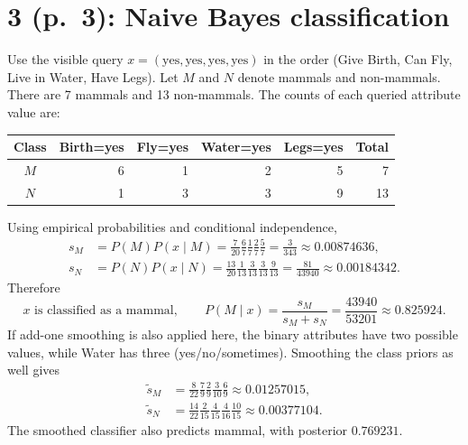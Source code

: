 \documentclass[11pt,a4paper]{article}
\begin{document}
\newpage
\section*{3 (p.\ 3): Naive Bayes classification}
Use the visible query $x=(\text{yes},\text{yes},\text{yes},\text{yes})$
in the order (Give Birth, Can Fly, Live in Water, Have Legs).
Let $M$ and $N$ denote mammals and non-mammals. There are 7 mammals and
13 non-mammals. The counts of each queried attribute value are:
\begin{center}
\begin{tabular}{c|rrrr|r}
\toprule
Class & Birth=yes & Fly=yes & Water=yes & Legs=yes & Total\\
\midrule
$M$ &6&1&2&5&7\\
$N$ &1&3&3&9&13\\
\bottomrule
\end{tabular}
\end{center}
Using empirical probabilities and conditional independence,
\[
\begin{aligned}
 s_M&=P(M)P(x\mid M)=\frac7{20}\frac67\frac17\frac27\frac57
      =\frac3{343}\approx0.00874636,\\
 s_N&=P(N)P(x\mid N)=\frac{13}{20}\frac1{13}\frac3{13}\frac3{13}\frac9{13}
      =\frac{81}{43940}\approx0.00184342.
\end{aligned}
\]
Therefore
\[
 \boxed{x\text{ is classified as a mammal}},\qquad
 P(M\mid x)=\frac{s_M}{s_M+s_N}=\frac{43940}{53201}\approx0.825924.
\]
If add-one smoothing is also applied here, the binary attributes have two
possible values, while Water has three (yes/no/sometimes). Smoothing the
class priors as well gives
\[
\begin{aligned}
 \widetilde s_M&=\frac8{22}\frac79\frac29\frac3{10}\frac69
     \approx0.01257015,\\
 \widetilde s_N&=\frac{14}{22}\frac2{15}\frac4{15}\frac4{16}\frac{10}{15}
     \approx0.00377104.
\end{aligned}
\]
The smoothed classifier also predicts mammal, with posterior $0.769231$.
\end{document}
